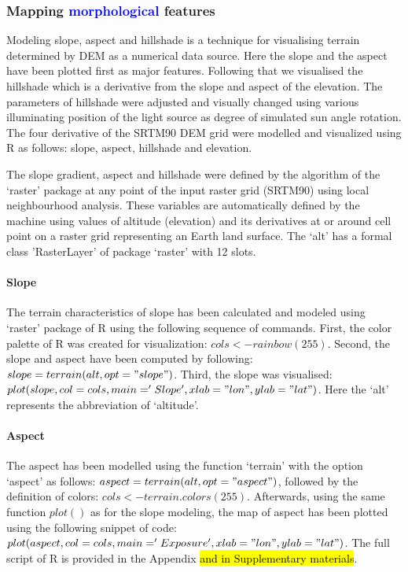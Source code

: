 \documentclass[land,article,submit,pdftex,moreauthors]{Definitions/mdpi}
\begin{document}
\subsubsection{Mapping \textcolor{blue}{morphological} features}
Modeling slope, aspect and hillshade is a technique for visualising terrain determined by DEM as a numerical data source. Here the slope and the aspect have been plotted first as major features. Following that we visualised the hillshade which is a derivative from the slope and aspect of the elevation. The parameters of hillshade were adjusted and visually changed using various illuminating position of the light source as degree of simulated sun angle rotation. The four derivative of the SRTM90 DEM grid were modelled and visualized using R as follows: slope, aspect, hillshade and elevation. 

The slope gradient, aspect and hillshade were defined by the algorithm of the ‘raster’ package at any point of the input raster grid (SRTM90) using local neighbourhood analysis. These variables are automatically defined by the machine using values of altitude (elevation) and its derivatives at or around cell point on a raster grid representing an Earth land surface. The ‘alt’ has a formal class 'RasterLayer' of package ‘raster’ with 12 slots.

\paragraph{Slope}
The terrain characteristics of slope has been calculated and modeled using ‘raster’ package of R using the following sequence of commands. First, the color palette of R was created for visualization: $cols <- rainbow(255)$. Second, the slope and aspect have been computed by following: $slope = terrain(alt, opt = "slope")$. Third, the slope was visualised: $plot(slope, col=cols, main='Slope', xlab = "lon", ylab = "lat")$. Here the ‘alt’ represents the abbreviation of ‘altitude’.

\paragraph{Aspect}
The aspect has been modelled using the function ‘terrain’ with the option ‘aspect’ as follows: $aspect = terrain(alt, opt = "aspect")$, followed by the definition of colors: $cols <- terrain.colors(255)$. Afterwards, using the same function $plot()$ as for the slope modeling, the map of aspect has been plotted using the following snippet of code: $plot(aspect, col=cols, main='Exposure', xlab = "lon", ylab = "lat")$. The full script of R is provided in the Appendix \hl{and in Supplementary materials}.
 
\end{document}
